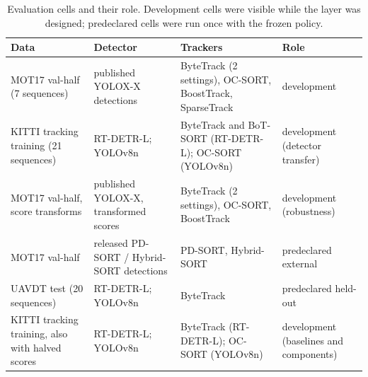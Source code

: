 \begin{table}[t]
\caption{Evaluation cells and their role. Development cells were visible while
the layer was designed; predeclared cells were run once with the frozen
policy.}
\label{tab:data}
\centering\footnotesize
\setlength{\tabcolsep}{4pt}
\begin{tabular}{@{}>{\raggedright\arraybackslash}p{29mm}>{\raggedright\arraybackslash}p{25mm}>{\raggedright\arraybackslash}p{42mm}>{\raggedright\arraybackslash}p{25mm}@{}}
\toprule
Data & Detector & Trackers & Role\\
\midrule
MOT17 val-half (7 sequences) & published YOLOX-X detections & ByteTrack (2 settings), OC-SORT, BoostTrack, SparseTrack & development\\
KITTI tracking training (21 sequences) & RT-DETR-L; YOLOv8n & ByteTrack and BoT-SORT (RT-DETR-L); OC-SORT (YOLOv8n) & development (detector transfer)\\
MOT17 val-half, score transforms & published YOLOX-X, transformed scores & ByteTrack (2 settings), OC-SORT, BoostTrack & development (robustness)\\
MOT17 val-half & released PD-SORT / Hybrid-SORT detections & PD-SORT, Hybrid-SORT & predeclared external\\
UAVDT test (20 sequences) & RT-DETR-L; YOLOv8n & ByteTrack & predeclared held-out\\
KITTI tracking training, also with halved scores & RT-DETR-L; YOLOv8n & ByteTrack (RT-DETR-L); OC-SORT (YOLOv8n) & development (baselines and components)\\
\bottomrule
\end{tabular}
\end{table}

